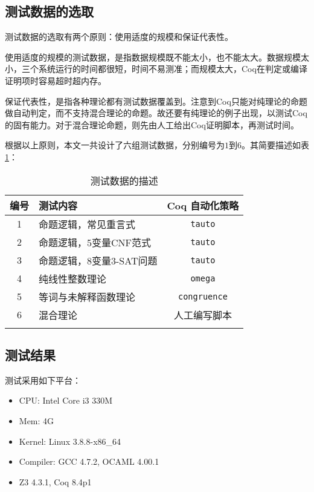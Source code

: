 \subsection{测试数据的选取}
测试数据的选取有两个原则：使用适度的规模和保证代表性。

使用适度的规模的测试数据，是指数据规模既不能太小，也不能太大。数据规模太小，三个系统运行的时间都很短，时间不易测准；而规模太大，Coq在判定或编译证明项时容易超时超内存。

保证代表性，是指各种理论都有测试数据覆盖到。注意到Coq只能对纯理论的命题做自动判定，而不支持混合理论的命题。故还要有纯理论的例子出现，以测试Coq的固有能力。对于混合理论命题，则先由人工给出Coq证明脚本，再测试时间。

根据以上原则，本文一共设计了六组测试数据，分别编号为$1$到$6$。其简要描述如表\ref{tab:test}：
\begin{table}[!ht]
  \caption{测试数据的描述}
  \label{tab:test}
  \centering
  \begin{tabular}{clc}
    \whline
    编号 & 测试内容 & Coq 自动化策略\\
    \hline
    1 & 命题逻辑，常见重言式 & \texttt{tauto} \\
    2 & 命题逻辑，5变量CNF范式 & \texttt{tauto} \\
    3 & 命题逻辑，8变量3-SAT问题 & \texttt{tauto} \\
    4 & 纯线性整数理论 & \texttt{omega} \\
    5 & 等词与未解释函数理论 & \texttt{congruence} \\
    6 & 混合理论 & 人工编写脚本 \\
    \whline
  \end{tabular}
\end{table}

\subsection{测试结果}
测试采用如下平台：
\begin{itemize}
  \item CPU: Intel Core i3 330M
  \item Mem: 4G
  \item Kernel: Linux 3.8.8-x86\_64
  \item Compiler: GCC 4.7.2, OCAML 4.00.1
  \item Z3 4.3.1, Coq 8.4p1
\end{itemize}


